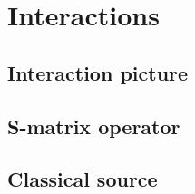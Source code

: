 \section{Interactions}

\subsection{Interaction picture}

\subsection{S-matrix operator}

\subsection{Classical source}


